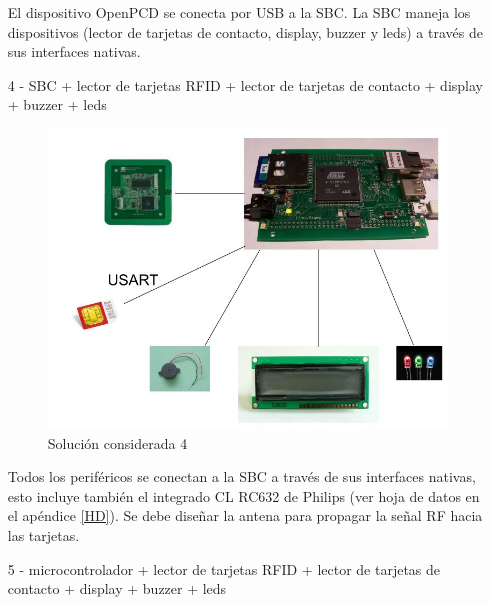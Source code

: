 \begin{itemize}
El dispositivo OpenPCD se conecta por USB a la SBC. La SBC maneja los dispositivos (lector de tarjetas de contacto, display, buzzer y leds) a través de sus interfaces nativas.

\bigskip
\bigskip
\item[4 -] SBC + lector de tarjetas RFID + lector de tarjetas de contacto + display + buzzer + leds
\bigskip

\begin{figure}[H]
\centering
  \begin{center}
  \includegraphics[scale=.25]{Imagenes/3.jpg} 
  \end{center}
  \caption{Solución considerada 4}\label{Fig:HW4} 
\end{figure}

Todos los periféricos se conectan a la SBC a través de sus interfaces nativas, esto incluye también el integrado CL RC632 de Philips \cite{RC632} (ver hoja de datos en el apéndice \ref{HD}). Se debe diseñar la antena para propagar la señal RF hacia las tarjetas.

\bigskip
\bigskip
\item[5 -] microcontrolador + lector de tarjetas RFID + lector de tarjetas de contacto + display + buzzer + leds
\bigskip


\end{itemize}
